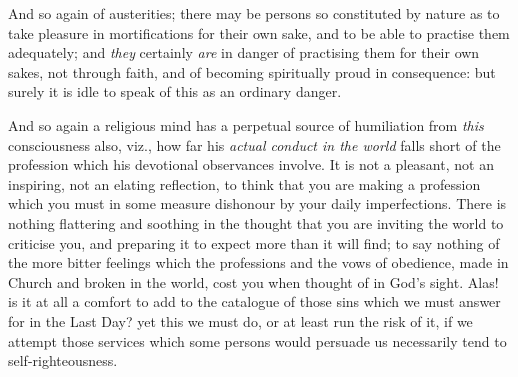 And so again of austerities; there may be persons so constituted by
nature as to take pleasure in mortifications for their own sake, and
to be able to practise them adequately; and \emph{they} certainly \emph{are}
in danger of practising them for their own sakes, not through faith,
and of becoming spiritually proud in consequence: but surely it is
idle to speak of this as an ordinary danger.

And so again a religious mind has a perpetual source of humiliation
from \emph{this} consciousness also, viz., how far his \emph{actual
conduct in the world} falls short of the profession which his
devotional observances involve. It is not a pleasant, not an
inspiring, not an elating reflection, to think that you are making a
profession which you must in some measure dishonour by your daily
imperfections. There is nothing flattering and soothing in the thought
that you are inviting the world to criticise you, and preparing it to
expect more than it will find; to say nothing of the more bitter
feelings which the professions and the vows of obedience, made in
Church and broken in the world, cost you when thought of in God's
sight. Alas! is it at all a comfort to add to the catalogue of those
sins which we must answer for in the Last Day? yet this we must do, or
at least run the risk of it, if we attempt those services which some
persons would persuade us necessarily tend to self-righteousness.

